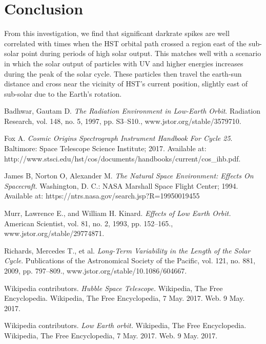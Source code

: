 \documentclass[a4paper,11pt]{article}
\begin{document}
\section{Conclusion}
From this investigation, we find that significant darkrate spikes are well correlated with times when the HST orbital path crossed
a region east of the sub-solar point during periods of high solar output.  This matches well with a scenario in which 
the solar output of particles with UV and higher energies increases during the peak of the solar cycle.  These 
particles then travel the earth-sun distance and cross near the vicinity of HST's current position, slightly east of sub-solar due to the Earth's rotation.





\pagebreak



\begin{thebibliography}{9}
Badhwar, Gautam D.
\textit{The Radiation Environment in Low-Earth Orbit}. Radiation Research, vol. 148, no. 5, 1997, pp. S3–S10., www.jstor.org/stable/3579710.

Fox A. 
\textit{Cosmic Origins Spectrograph Instrument Handbook For Cycle 25}. Baltimore: Space Telescope Science Institute; 2017. Available at: http://www.stsci.edu/hst/cos/documents/handbooks/current/cos\_ihb.pdf. 

James B, Norton O, Alexander M. 
\textit{The Natural Space Environment: Effects On Spacecraft}. Washington, D. C.: NASA Marshall Space Flight Center; 1994. Available at: https://ntrs.nasa.gov/search.jsp?R=19950019455

Murr, Lawrence E., and William H. Kinard. 
\textit{Effects of Low Earth Orbit.} American Scientist, vol. 81, no. 2, 1993, pp. 152–165., www.jstor.org/stable/29774871.

Richards, Mercedes T., et al. 
\textit{Long-Term Variability in the Length of the Solar Cycle}.
 Publications of the Astronomical Society of the Pacific, vol. 121, no. 881, 2009, pp. 797–809., www.jstor.org/stable/10.1086/604667.

Wikipedia contributors. \textit{Hubble Space Telescope.} Wikipedia, The Free Encyclopedia. Wikipedia, The Free Encyclopedia, 7 May. 2017. Web. 9 May. 2017.

Wikipedia contributors. \textit{Low Earth orbit.} Wikipedia, The Free Encyclopedia. Wikipedia, The Free Encyclopedia, 7 May. 2017. Web. 9 May. 2017.



\end{thebibliography}
\end{document}
